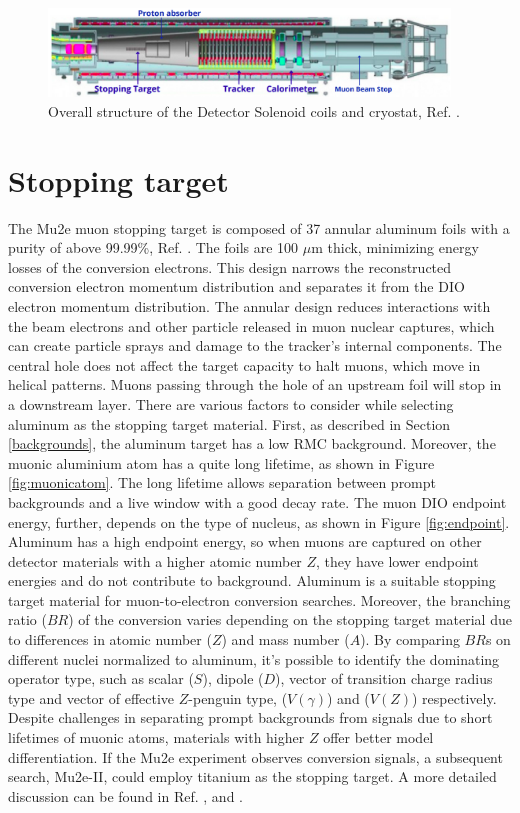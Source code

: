 \begin{figure}[!h]
\centering
\includegraphics[width =0.95\textwidth]{figures/png/Screenshot_20240306_225639.png}
\caption{Overall structure of the Detector Solenoid coils and cryostat, Ref. \cite{bobbb}.}
\label{fig:DS}
\end{figure}
\section{Stopping target}
The Mu2e muon stopping target is composed of 37 annular aluminum foils  with a purity of above 99.99\%, Ref. \cite{bobbb}. The foils are 100 $\mu$m thick, minimizing energy losses of the conversion electrons. This design narrows the reconstructed conversion electron momentum distribution and separates it from the DIO electron momentum distribution. The annular design reduces interactions with the beam electrons and other particle released in muon nuclear captures, which can create particle sprays and damage to the tracker's internal components. The central hole does not affect the target capacity to halt muons, which move in helical patterns. Muons passing through the hole of an upstream foil will stop in a downstream layer. There are various factors to consider while selecting aluminum as the stopping target material. First, as described in Section \ref{backgrounds}, the aluminum target has a low RMC background. Moreover, the muonic aluminium atom has a quite long lifetime, as shown in Figure \ref{fig:muonicatom}. The long lifetime allows separation between prompt backgrounds and a live window with a good decay rate. The muon DIO endpoint energy, further, depends on the type of nucleus, as shown in Figure \ref{fig:endpoint}. Aluminum has a high endpoint energy, so when muons are captured on other detector materials with a higher atomic number $Z$, they have lower endpoint energies and do not contribute to background. Aluminum is a suitable stopping target material for muon-to-electron conversion searches.
Moreover, the branching ratio ($BR$) of the conversion varies depending on the stopping target material due to differences in atomic number ($Z$) and mass number ($A$). By comparing $BR$s on different nuclei normalized to aluminum, it's possible to identify the dominating operator type, such as scalar ($S$), dipole ($D$), vector of transition charge radius type and vector of effective $Z$-penguin type, ($V(\gamma)$) and ($V(Z)$) respectively. Despite challenges in separating prompt backgrounds from signals due to short lifetimes of muonic atoms, materials with higher $Z$ offer better model differentiation. If the Mu2e experiment observes conversion signals, a subsequent search, Mu2e-II, could employ titanium as the stopping target. A more detailed discussion can be found in Ref. \cite{PhysRevD.80.013002}, \cite{PhysRevD.76.059902} and \cite{abusalma2018expression}.
